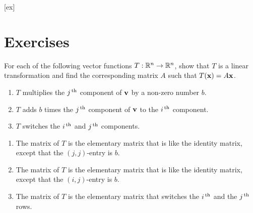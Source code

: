 [ex]
\section*{Exercises}

\begin{enumialphparenastyle}

\begin{ex}
  For each of the following vector functions $T:\mathbb{R}^{n}\to\mathbb{R}^{n}$, show
  that $T$ is a linear transformation and find the corresponding
  matrix $A$ such that $T(\mbox{\bf x}) = A\mbox{\bf x}$.
  \begin{enumerate}
  \item $T$ multiplies the $j^{\,\rm th}$ component of $\mbox{\bf v}$ by a
    non-zero number $b$.
  \item $T$ adds $b$ times the
    $j^{\,\rm th}$ component of $\mbox{\bf v}$ to the $i^{\,\rm th}$ component. 
  \item $T$ switches the $i^{\,\rm th}$ and $j^{\,\rm th}$ components.
  \end{enumerate}
  \begin{sol}
    \begin{enumerate}
    \item The matrix of $T$ is the elementary matrix that is like the
      identity matrix, except that the $(j,j)$-entry is $b$.
    \item The matrix of $T$ is the elementary matrix that is like the
      identity matrix, except that the $(i,j)$-entry is $b$. 
    \item The matrix of $T$ is the elementary matrix that switches the
      $i^{\,\rm th}$ and the $j^{\,\rm th}$ rows.
    \end{enumerate}
  \end{sol}
\end{ex}


\end{enumialphparenastyle}
